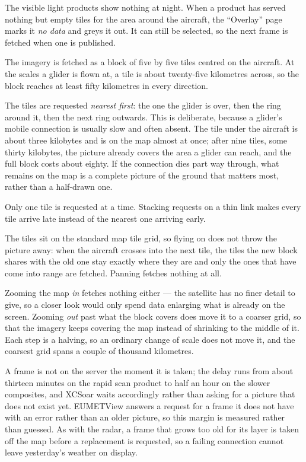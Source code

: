 The visible light products show nothing at night.  When a product
has served nothing but empty tiles for the area around the aircraft,
the ``Overlay'' page marks it \emph{no data} and greys it out.  It
can still be selected, so the next frame is fetched when one is
published.

The imagery is fetched as a block of five by five tiles centred on
the aircraft.  At the scales a glider is flown at, a tile is about
twenty-five kilometres across, so the block reaches at least fifty
kilometres in every direction.

The tiles are requested \emph{nearest first}: the one the glider is
over, then the ring around it, then the next ring outwards.  This is
deliberate, because a glider's mobile connection is usually slow and
often absent.  The tile under the aircraft is about three kilobytes
and is on the map almost at once; after nine tiles, some thirty
kilobytes, the picture already covers the area a glider can reach,
and the full block costs about eighty.  If the connection dies part
way through, what remains on the map is a complete picture of the
ground that matters most, rather than a half-drawn one.

Only one tile is requested at a time.  Stacking requests on a thin
link makes every tile arrive late instead of the nearest one arriving
early.

The tiles sit on the standard map tile grid, so flying on does not
throw the picture away: when the aircraft crosses into the next tile,
the tiles the new block shares with the old one stay exactly where
they are and only the ones that have come into range are fetched.
Panning fetches nothing at all.

Zooming the map \emph{in} fetches nothing either --- the satellite has
no finer detail to give, so a closer look would only spend data
enlarging what is already on the screen.  Zooming \emph{out} past what
the block covers does move it to a coarser grid, so that the imagery
keeps covering the map instead of shrinking to the middle of it.  Each
step is a halving, so an ordinary change of scale does not move it,
and the coarsest grid spans a couple of thousand kilometres.

A frame is not on the server the moment it is taken; the delay runs
from about thirteen minutes on the rapid scan product to half an hour
on the slower composites, and XCSoar waits accordingly rather than
asking for a picture that does not exist yet.  EUMETView answers a
request for a frame it does not have with an error rather than an
older picture, so this margin is measured rather than guessed.  As with the radar, a
frame that grows too old for its layer is taken off the map before a
replacement is requested, so a failing connection cannot leave
yesterday's weather on display.

